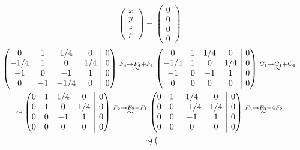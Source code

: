 \documentclass[11pt,a4paper]{article}
\newcommand{\rvline}{\hspace*{-\arraycolsep}\vline\hspace*{-\arraycolsep}}
\begin{document}
\begin{enumerate}
\begin{equation*}
\begin{pmatrix}
                x\\
                y\\
                z\\
                t
            \end{pmatrix}=\begin{pmatrix}
                0\\
                0\\
                0\\
                0
            \end{pmatrix}
        \end{equation*}
        \begin{multline*}
            \begin{pmatrix}
                0 & 1 & 1/4 & 0 & \rvline & 0 \\
                -1/4 & 1 & 0 & 1/4 & \rvline & 0 \\
                -1 & 0 & -1 & 1 & \rvline & 0 \\
                 0 & -1 & -1/4 & 0 & \rvline & 0
            \end{pmatrix}\stackrel{F_4\rightarrow F_4+F_1}{\sim}\begin{pmatrix}
                0 & 1 & 1/4 & 0 & \rvline & 0 \\
                -1/4 & 1 & 0 & 1/4 & \rvline & 0 \\
                -1 & 0 & -1 & 1 & \rvline & 0 \\
                 0 & 0 & 0 & 0 & \rvline & 0
            \end{pmatrix}\stackrel{C_1\rightarrow C_1+C_4}{\sim}\\\sim\begin{pmatrix}
                0 & 1 & 1/4 & 0 & \rvline & 0 \\
                0 & 1 & 0 & 1/4 & \rvline & 0 \\
                0 & 0 & -1 & 1 & \rvline & 0 \\
                0 & 0 & 0 & 0 & \rvline & 0
            \end{pmatrix}\stackrel{F_2\rightarrow F_2-F_1}{\sim}\begin{pmatrix}
                0 & 1 & 1/4 & 0 & \rvline & 0 \\
                0 & 0 & -1/4 & 1/4 & \rvline & 0 \\
                0 & 0 & -1 & 1 & \rvline & 0 \\
                0 & 0 & 0 & 0 & \rvline & 0
            \end{pmatrix}\stackrel{F_3\rightarrow F_3-4F_2}{\sim}\\\sim\begin{pmatrix}

\end{pmatrix}
\end{multline*}
\end{enumerate}
\end{document}
